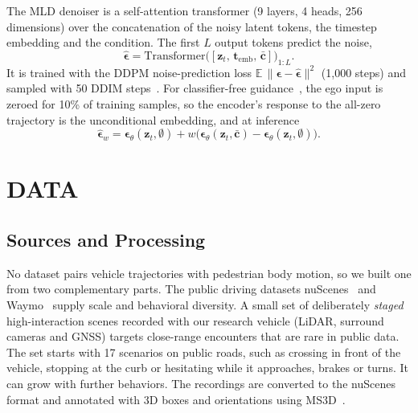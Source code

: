 \documentclass[letterpaper, 10 pt, conference]{ieeeconf}
\begin{document}
The MLD denoiser is a self-attention transformer (9 layers, 4 heads, 256 dimensions) over the concatenation of the noisy latent tokens, the timestep embedding and the condition. The first $L$ output tokens predict the noise,
\begin{equation}
  \hat{\boldsymbol{\epsilon}} = \mathrm{Transformer}\bigl([\mathbf{z}_t,\, \mathbf{t}_{\mathrm{emb}},\, \bar{\mathbf{c}}]\bigr)_{1:L}.
\end{equation}
It is trained with the DDPM noise-prediction loss $\mathbb{E}\,\|\boldsymbol{\epsilon} - \hat{\boldsymbol{\epsilon}}\|^2$ (1{,}000 steps) and sampled with 50 DDIM steps~\cite{song2021ddim}.
For classifier-free guidance~\cite{ho2022cfg}, the ego input is zeroed for 10\% of training samples, so the encoder's response to the all-zero trajectory is the unconditional embedding, and at inference
\begin{equation}
  \hat{\boldsymbol{\epsilon}}_w = \boldsymbol{\epsilon}_\theta(\mathbf{z}_t, \emptyset) + w \bigl(\boldsymbol{\epsilon}_\theta(\mathbf{z}_t, \bar{\mathbf{c}}) - \boldsymbol{\epsilon}_\theta(\mathbf{z}_t, \emptyset)\bigr).
\end{equation}

\section{DATA}
\label{sec:data}

\subsection{Sources and Processing}

No dataset pairs vehicle trajectories with pedestrian body motion, so we built one from two complementary parts. The public driving datasets nuScenes~\cite{caesar2020nuscenes} and Waymo~\cite{sun2020waymo} supply scale and behavioral diversity. A small set of deliberately \emph{staged} high-interaction scenes recorded with our research vehicle (LiDAR, surround cameras and GNSS) targets close-range encounters that are rare in public data.
The set starts with 17 scenarios on public roads, such as crossing in front of the vehicle, stopping at the curb or hesitating while it approaches, brakes or turns. It can grow with further behaviors. %
The recordings are converted to the nuScenes format and annotated with 3D boxes and orientations using MS3D~\cite{tsai2024ms3d++,tsai2023ms3d}.
\end{document}
